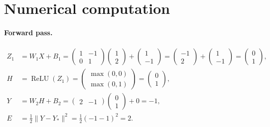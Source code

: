 \documentclass[11pt,a4paper]{article}
\newcommand{\relu}{\operatorname{ReLU}}
\newcommand{\C}[1]{{\color{chg}#1}}          %
\begin{document}
\section{\C{Numerical computation}}
{\color{chg}
\paragraph{Forward pass.}
\begin{align*}
Z_1&=W_1X+B_1=\begin{pmatrix}1&-1\\0&1\end{pmatrix}\begin{pmatrix}1\\2\end{pmatrix}+\begin{pmatrix}1\\-1\end{pmatrix}
=\begin{pmatrix}-1\\2\end{pmatrix}+\begin{pmatrix}1\\-1\end{pmatrix}=\begin{pmatrix}0\\1\end{pmatrix},\\
H&=\relu(Z_1)=\begin{pmatrix}\max(0,0)\\\max(0,1)\end{pmatrix}=\begin{pmatrix}0\\1\end{pmatrix},\\
Y&=W_2H+B_2=\begin{pmatrix}2&-1\end{pmatrix}\begin{pmatrix}0\\1\end{pmatrix}+0=-1,\\
E&=\tfrac12\lVert Y-Y_*\rVert^2=\tfrac12(-1-1)^2=2.
\end{align*}

}
\end{document}
